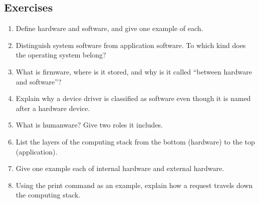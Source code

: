 \documentclass[11pt]{article}
\begin{document}
\subsection*{Exercises}
\begin{enumerate}[label=\arabic*.]
  \item Define hardware and software, and give one example of each.
  \item Distinguish system software from application software. To which kind
    does the operating system belong?
  \item What is firmware, where is it stored, and why is it called ``between
    hardware and software''?
  \item Explain why a device driver is classified as software even though it
    is named after a hardware device.
  \item What is humanware? Give two roles it includes.
  \item List the layers of the computing stack from the bottom (hardware) to
    the top (application).
  \item Give one example each of internal hardware and external hardware.
  \item Using the print command as an example, explain how a request travels
    down the computing stack.
\end{enumerate}
\end{document}
